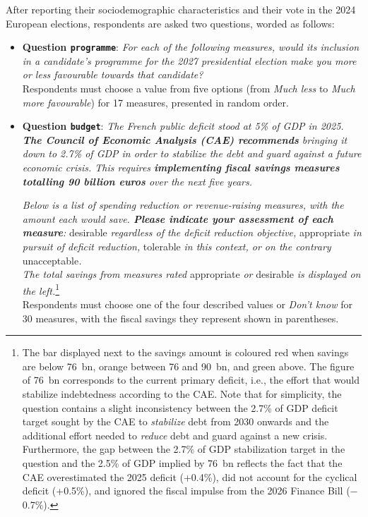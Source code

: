 \documentclass[12pt,english]{article}
\begin{document}
After reporting their sociodemographic characteristics and their vote in the 2024 European elections, respondents are asked two questions, worded as follows:

\begin{itemize}
  \item \textbf{Question \texttt{programme}}: \textit{For each of the following measures, would its inclusion in a candidate's programme for the 2027 presidential election make you more or less favourable towards that candidate?} \\ Respondents must choose a value from five options (from \textit{Much less} to \textit{Much more favourable}) for 17 measures, presented in random order.
  \item \textbf{Question \texttt{budget}}: \textit{The French public deficit stood at 5\% of GDP in 2025. \textbf{The Council of Economic Analysis (CAE) recommends} bringing it down to 2.7\% of GDP in order to stabilize the debt and guard against a future economic crisis. This requires \textbf{implementing fiscal savings measures totalling 90 billion euros} over the next five years.}

\textit{Below is a list of spending reduction or revenue-raising measures, with the amount each would save.
\textbf{Please indicate your assessment of each measure}: }desirable\textit{ regardless of the deficit reduction objective, }appropriate\textit{ in pursuit of deficit reduction, }tolerable\textit{ in this context, or on the contrary }unacceptable\textit{.\\
The total savings from measures rated }appropriate\textit{ or }desirable\textit{ is displayed on the left.}\footnote{The bar displayed next to the savings amount is coloured red when savings are below 76~bn, orange between 76 and 90~bn, and green above. The figure of 76~bn corresponds to the current primary deficit, i.e., the effort that would stabilize indebtedness according to the CAE. Note that for simplicity, the question contains a slight inconsistency between the 2.7\% of GDP deficit target sought by the CAE to \textit{stabilize} debt from 2030 onwards and the additional effort needed to \textit{reduce} debt and guard against a new crisis. Furthermore, the gap between the 2.7\% of GDP stabilization target in the question and the 2.5\% of GDP implied by 76~bn reflects the fact that the CAE overestimated the 2025 deficit (+0.4\%), did not account for the cyclical deficit (+0.5\%), and ignored the fiscal impulse from the 2026 Finance Bill ($-$0.7\%).
 } \\ Respondents must choose one of the four described values or \textit{Don't know} for 30 measures, with the fiscal savings they represent shown in parentheses.
\end{itemize}
\end{document}
